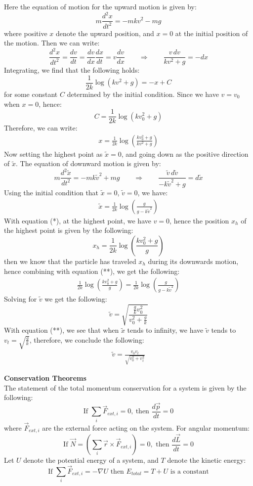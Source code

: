 \documentclass[11pt,oneside]{book}
\theoremstyle{break}
\theoremstyle{break}
\begin{document}
Here the equation of motion for the upward motion is given by:
$$m\frac{d^2x}{dt^2} = -mkv^2 - mg$$
where positive $x$ denote the upward position, and $x=0$ at the initial position of the motion. Then we can write:
$$\frac{d^2 x}{dt^2} = \frac{dv}{dt} = \frac{dv}{dx}\frac{dx}{dt} = v\frac{dv}{dx} \qquad \Rightarrow \qquad \frac{v\, dv}{kv^2+g} = -dx$$
Integrating, we find that the following holds:
$$\frac{1}{2k}\log(kv^2+g) = -x+C$$
for some constant $C$ determined by the initial condition. Since we have $v=v_0$ when $x=0$, hence:
$$C =\frac{1}{2k}\log(kv_0^2+g)$$
Therefore, we can write:
\begin{align*}
x = \frac{1}{2k}\log\left(\frac{kv_0^2+g}{kv^2+g} \right) \tag{*}
\end{align*}
Now setting the highest point as $\widetilde{x}=0$, and going down as the positive direction of $\widetilde{x}$. The equation of downward motion is given by:
$$m\frac{d^2\widetilde{x}}{dt^2} = -mk\widetilde{v}^2 +mg \qquad \Rightarrow \qquad \frac{\widetilde{v}\, d\widetilde{v}}{-k\widetilde{v}^2+g} = d\widetilde{x}$$
Using the initial condition that $\widetilde{x}=0$, $\widetilde{v}=0$, we have:
\begin{align*}
\widetilde{x} = \frac{1}{2k}\log\left( \frac{g}{g-k\widetilde{v}^2}\right) \tag{**}
\end{align*}
With equation (*), at the highest point, we have $v=0$, hence the position $x_h$ of the highest point is given by the following:
$$x_h = \frac{1}{2k}\log \left( \frac{kv_0^2+g}{g}\right)$$
then we know that the particle has traveled $x_h$ during its downwards motion, hence combining with equation (**), we get the following: 
\begin{align*}
\frac{1}{2k}\log \left(\frac{kv_0^2+g}{g}\right) = \frac{1}{2k}\log\left(\frac{g}{g-k\widetilde{v}^2}\right)
\end{align*}
Solving for $\widetilde{v}$ we get the following:
$$\widetilde{v} =\sqrt{\frac{\frac{g}{k}v_0^2}{v_0^2+\frac{g}{k}}}$$
With equation (**), we see that when $\widetilde{x}$ tends to infinity, we have $\widetilde{v}$ tends to $v_t= \sqrt{\frac{g}{k}}$, therefore, we conclude the following:
\begin{align*}
\widetilde{v} = \frac{v_0v_t}{\sqrt{v_0^2 + v_t^2}}
\end{align*}

\newpage
\textbf{Conservation Theorems}\\
The statement of the total momentum conservation for a system is given by the following: 
$$\text{If } \sum_i \vec{F}_{ext,i} = 0, \ \text{then }\frac{d\vec{p}}{dt} = 0$$
where $\vec{F}_{ext,i}$ are the external force acting on the system. For angular momentum:
$$\text{If }\vec{N} = \left(\sum_i \vec{r}\times \vec{F}_{ext,i} \right) = 0, \text{ then }\frac{d\vec{L}}{dt} = 0$$
Let $U$ denote the potential energy of a system, and $T$ denote the kinetic energy: $$ \text{If }\sum_i \vec{F}_{ext,i} = -\nabla U\text{ then }E_{total} = T+U\text{ is a constant}$$
\hfill\break
\end{document}
